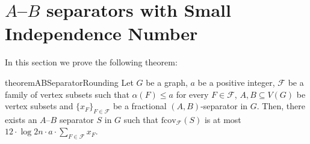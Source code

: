 \documentclass[11pt]{amsart}
\newtheorem{lemma}[theorem]{Lemma}
\newcommand{\cal}{\mathcal}
\begin{document}

 \section{$A$--$B$ separators with Small Independence Number}\label{sec:ab_seps}
In this section we prove the following theorem:

\begin{restatable}{theorem}{ABSeparatorRounding}
\label{thm:A-B_separator}
Let $G$ be a graph, $a$ be a positive integer, $\mathcal{F}$ be a family of vertex subsets such that $\alpha(F) \leq a$ for every $F\in\mathcal{F}$, $A, B \subseteq V(G)$ be  vertex subsets and $\{x_F\}_{F \in \mathcal{F}}$ be a fractional $(A,B)$-separator in $G$. Then, there exists an $A$--$B$ separator $S$ in $G$ such that $\mathrm{fcov}_{\mathcal{F}}(S)$ is at most $12 \cdot \log 2n \cdot a \cdot \sum_{F \in \mathcal{F}} x_F$.
\end{restatable}
\end{document}
